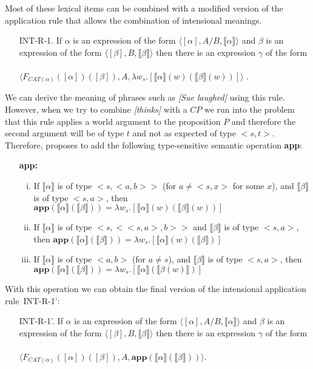 \documentclass[parskip=half]{scrartcl}
\newcommand{\sem}[1]{\ensuremath{\llbracket#1\rrbracket}}
\begin{document}
Most of these lexical items can be combined with 
a modified version of the  application rule that allows the
combination of intensional meanings.

\begin{enumerate}[INT-R-1.]
\item[{INT-R-1.}] If $\alpha$ is  an expression of the form $\langle [\alpha], A/B, \sem{\alpha} \rangle$
and $\beta$ is an expression of the form $\langle [\beta], B, \sem{\beta} \rangle$ then there is an
expression $\gamma$ of the form ~\\ 
$\langle F_{CAT(\alpha)}([\alpha])([\beta]), A, \lambda w_s.[\sem{\alpha}(w)(\sem{\beta}(w))]\rangle$ \citep[Ch. 20]{jacobson2014}.
\end{enumerate}

We can derive the meaning of phrases such as \textit{[Sue laughed]} using this rule. 
However, when we try to combine \textit{[thinks]} with a $CP$ we run into
the problem that this rule applies a world argument to the proposition $P$ and therefore the second
argument will be of type $t$ and not as expected of type $<s,t>$. Therefore, \cite{jacobson2014}
proposes to add the following type-sensitive semantic operation \textbf{app}:

\begin{enumerate}
\item[\textbf{app:}] 
\begin{enumerate}[i.]
\item If \sem{\alpha} is of type $<s, <a,b>>$ (for $a \ne <s,x>$ for some $x$), and \sem{\beta} is of type $<s,a>$, then 
$\mathbf{app}(\sem{\alpha}(\sem{\beta})) = \lambda w_s.[\sem{\alpha}(w)(\sem{\beta}(w))]$
\item If \sem{\alpha} is of type $<s, <<s,a>,b>>$  and \sem{\beta} is of type $<s,a>$, then 
$\mathbf{app}(\sem{\alpha}(\sem{\beta})) = \lambda w_s.[\sem{\alpha}(w)(\sem{\beta})]$
\item If \sem{\alpha} is of type $<a,b>$  (for $a \ne s$), and \sem{\beta} is of type $<s,a>$, then 
$\mathbf{app}(\sem{\alpha}(\sem{\beta})) = \lambda w_s.[\sem{\alpha}(\sem{\beta(w)})]$
\end{enumerate}
\end{enumerate}

With this operation we can obtain the final version of the intensional application
rule~INT-R-1':

\begin{enumerate}[INT-R-1'.]
\item[{INT-R-1'.}] If $\alpha$ is  an expression of the form $\langle [\alpha], A/B, \sem{\alpha} \rangle$
and $\beta$ is an expression of the form $\langle [\beta], B, \sem{\beta} \rangle$ then there is an
expression $\gamma$ of the form ~\\ 
$\langle F_{CAT(\alpha)}([\alpha])([\beta]), A, \mathbf{app}(\sem{\alpha}(\sem{\beta}))\rangle$.
\end{enumerate}
\end{document}
